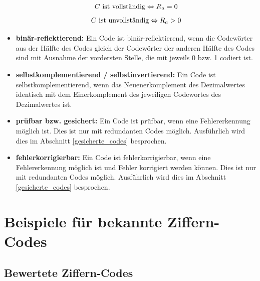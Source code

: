 \documentclass[11pt,a4paper]{scrreprt}
\begin{document}
\begin{itemize}
	$$ C \textnormal{ ist vollständig} \Leftrightarrow R_a = 0 $$
	$$ C \textnormal{ ist unvollständig} \Leftrightarrow R_a > 0 $$
\item
	\textbf{binär-reflektierend:} Ein Code ist binär-reflektierend, wenn die Codewörter aus der Hälfte des Codes gleich der Codewörter der anderen Hälfte des Codes sind mit Ausnahme der vordersten Stelle, die mit jeweils 0 bzw. 1 codiert ist.
\item
	\textbf{selbstkomplementierend / selbstinvertierend:} Ein Code ist selbstkomplementierend, wenn das Neuenerkomplement des Dezimalwertes identisch mit dem Einerkomplement des jeweiligen Codewortes des Dezimalwertes ist.
\item
	\textbf{prüfbar bzw. gesichert:} Ein Code ist prüfbar, wenn eine Fehlererkennung möglich ist. Dies ist nur mit redundanten Codes möglich. Ausführlich wird dies im Abschnitt \ref{gesicherte_codes} besprochen.
\item
	\textbf{fehlerkorrigierbar:} Ein Code ist fehlerkorrigierbar, wenn eine Fehlererkennung möglich ist und Fehler korrigiert werden können. Dies ist nur mit redundanten Codes möglich. Ausführlich wird dies im Abschnitt \ref{gesicherte_codes} besprochen.
\end{itemize}

\section{Beispiele für bekannte Ziffern-Codes}
\subsection*{Bewertete Ziffern-Codes}
\end{document}
